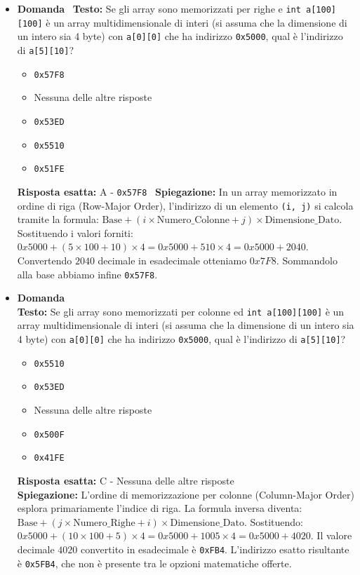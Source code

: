 \documentclass[12pt, a4paper]{article}
\newcounter{domandateoria}
\begin{document}
\begin{itemize}
\item {}\textbf{Domanda \thedomandateoria} \
\textbf{Testo:} Se gli array sono memorizzati per righe e \texttt{int a[100][100]} è un array multidimensionale di interi (si assuma che la dimensione di un intero sia 4 byte) con \texttt{a[0][0]} che ha indirizzo \texttt{0x5000}, qual è l'indirizzo di \texttt{a[5][10]}?
\begin{itemize}
\item[A)] \texttt{0x57F8}
\item[B)] Nessuna delle altre risposte
\item[C)] \texttt{0x53ED}
\item[D)] \texttt{0x5510}
\item[E)] \texttt{0x51FE}
\end{itemize}
\textbf{Risposta esatta:} A - \texttt{0x57F8} \
\textbf{Spiegazione:} In un array memorizzato in ordine di riga (Row-Major Order), l'indirizzo di un elemento \texttt{(i, j)} si calcola tramite la formula: $\text{Base} + (i \times \text{Numero\_Colonne} + j) \times \text{Dimensione\_Dato}$.
Sostituendo i valori forniti: $0x5000 + (5 \times 100 + 10) \times 4 = 0x5000 + 510 \times 4 = 0x5000 + 2040$.
Convertendo $2040$ decimale in esadecimale otteniamo $0x7F8$. Sommandolo alla base abbiamo infine \texttt{0x57F8}.
\vspace{0.3cm}

\item {}\textbf{Domanda \thedomandateoria} \\
\textbf{Testo:} Se gli array sono memorizzati per colonne ed \texttt{int a[100][100]} è un array multidimensionale di interi (si assuma che la dimensione di un intero sia 4 byte) con \texttt{a[0][0]} che ha indirizzo \texttt{0x5000}, qual è l'indirizzo di \texttt{a[5][10]}?
\begin{itemize}
    \item[A)] \texttt{0x5510}
    \item[B)] \texttt{0x53ED}
    \item[C)] Nessuna delle altre risposte
    \item[D)] \texttt{0x500F}
    \item[E)] \texttt{0x41FE}
\end{itemize}
\textbf{Risposta esatta:} C - Nessuna delle altre risposte \\
\textbf{Spiegazione:} L'ordine di memorizzazione per colonne (Column-Major Order) esplora primariamente l'indice di riga. La formula inversa diventa: $\text{Base} + (j \times \text{Numero\_Righe} + i) \times \text{Dimensione\_Dato}$.
Sostituendo: $0x5000 + (10 \times 100 + 5) \times 4 = 0x5000 + 1005 \times 4 = 0x5000 + 4020$.
Il valore decimale $4020$ convertito in esadecimale è \texttt{0xFB4}. L'indirizzo esatto risultante è \texttt{0x5FB4}, che non è presente tra le opzioni matematiche offerte.
\vspace{0.3cm}


\end{itemize}
\end{document}

